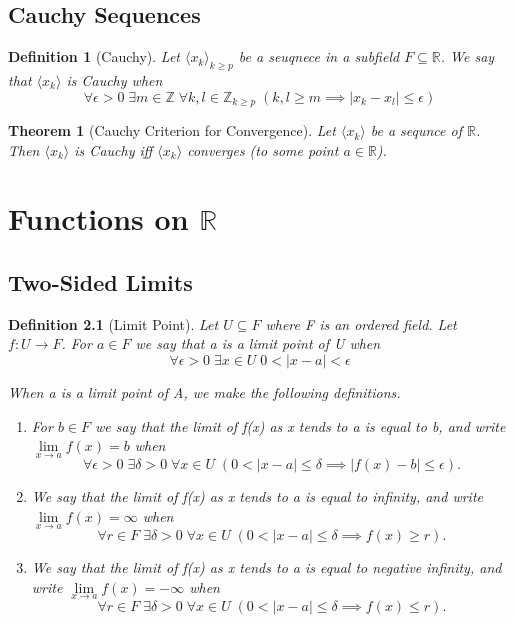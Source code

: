 \documentclass[11pt, oneside]{book}
\theoremstyle{break}
\newtheorem{thm}{Theorem}[section]
\newtheorem{defn}{Definition}[section]
\newcommand{\bb}[1]{\mathbb{#1}}		%
\begin{document}
\section{Cauchy Sequences}

\begin{defn}[Cauchy]
	Let $\langle x_k \rangle_{k \geq p}$ be a seuqnece in a subfield $F \subseteq \bb{R}$. We say that $\langle x_k \rangle$ is Cauchy when
	\[
		\forall \epsilon > 0 \; \exists m \in \bb{Z} \; \forall k, l \in \bb{Z}_{k \geq p}\; (k, l \geq m \implies |x_k - x_l| \leq \epsilon)
	\]
\end{defn}

\begin{thm}[Cauchy Criterion for Convergence]
	Let $\langle x_k \rangle$ be a sequnce of $\bb{R}$. Then $\langle x_k \rangle$ is Cauchy iff $\langle x_k \rangle$ converges (to some point $a \in \bb{R}$).
\end{thm}


\chapter{Functions on \texorpdfstring{$\bb{R}$}{R}}


\section{Two-Sided Limits}

\begin{defn}[Limit Point]
	Let $U \subseteq F$ where F is an ordered field. Let $f: U \to F$. For $a \in F$ we say that a is a limit point of U when
	\[
		\forall \epsilon > 0 \; \exists x \in U \; 0 < |x - a| < \epsilon
	\]

	When a is a limit point of A, we make the following definitions.
	\begin{enumerate}
		\item For $b \in F$ we say that the limit of f(x) as x tends to a is equal to b, and write $\lim\limits_{x \to a} f(x) = b$ when
			\[
				\forall \epsilon > 0 \; \exists \delta > 0 \; \forall x \in U \; (0 < |x - a| \leq \delta \implies |f(x) - b| \leq \epsilon).
			\]
		\item We say that the limit of f(x) as x tends to a is equal to infinity, and write $\lim\limits_{x \to a} f(x) = \infty$ when
			\[
				\forall r \in F \; \exists \delta > 0 \; \forall x \in U \; (0 < |x - a| \leq \delta \implies f(x) \geq r).
			\]
		\item We say that the limit of f(x) as x tends to a is equal to negative infinity, and write $\lim\limits_{x \to a}f(x) = -\infty$ when
			\[
				\forall r \in F \; \exists \delta > 0 \; \forall x \in U \; (0 < |x - a| \leq \delta \implies f(x) \leq r).
			\]
	\end{enumerate}
\end{defn}
\end{document}
